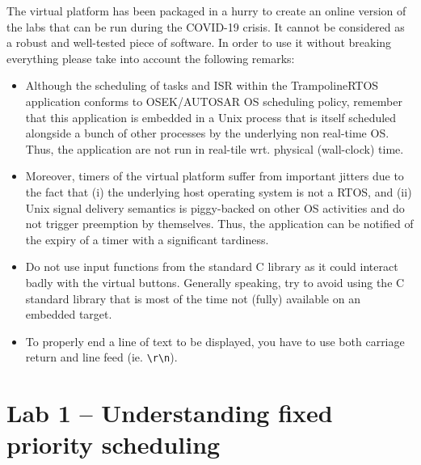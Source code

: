 \documentclass[11pt]{report}
\begin{document}
The virtual platform has been packaged in a hurry to create an online version of the labs that can be run during the COVID-19 crisis.
It cannot be considered as a robust and well-tested piece of software.
In order to use it without breaking everything please take into account the following remarks:

\begin{itemize}
  \item
    Although the scheduling of tasks and ISR within the TrampolineRTOS application conforms to OSEK/AUTOSAR OS scheduling policy, remember that this application is embedded in a Unix process that is itself scheduled alongside a bunch of other processes by the underlying non real-time OS.
    Thus, the application are not run in real-tile wrt. physical (wall-clock) time.

  \item
    Moreover, timers of the virtual platform suffer from important jitters due to the fact that (i) the underlying host operating system is not a RTOS, and (ii) Unix signal delivery semantics is piggy-backed on other OS activities and do not trigger preemption by themselves.
    Thus, the application can be notified of the expiry of a timer with a significant tardiness.

  \item
    Do not use input functions from the standard C library as it could interact badly with the virtual buttons.
    Generally speaking, try to avoid using the C standard library that is most of the time not (fully) available on an embedded target.

  \item
    To properly end a line of text to be displayed, you have to use both carriage return and line feed (ie. \verb|\r\n|).
\end{itemize}



\chapter{Lab 1 -- Understanding fixed priority scheduling}
\end{document}
